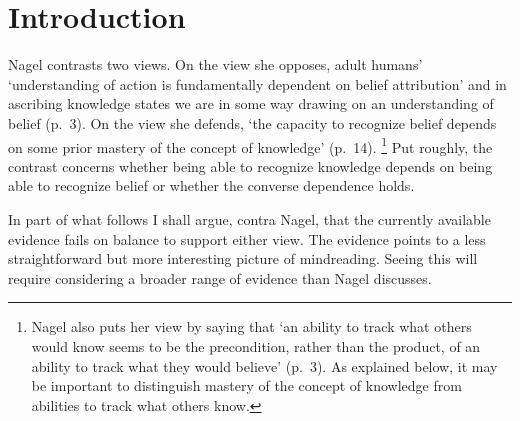 \documentclass[11pt,a4paper]{extarticle}
\begin{document}
\setlength\footnotesep{1em}




\maketitle





\section{Introduction}
Nagel contrasts two views.
On the view she opposes, adult humans' `understanding of action is fundamentally dependent on belief attribution' and in ascribing knowledge states we are in some way drawing on an understanding of belief (p.\ 3).
On the view she defends, `the capacity to recognize belief depends on some prior mastery of the concept of knowledge' (p.\ 14).%
\footnote{
Nagel also puts her view by saying that `an ability to track what others would know seems to be the precondition, rather than the product, of an ability to track what they would believe' (p.\ 3).
As explained below, it may be important to distinguish mastery of the concept of knowledge from abilities to track what others know.
}
Put roughly, the contrast concerns whether being able to recognize knowledge depends on being able to recognize belief or whether the converse dependence holds.

In part of what follows
I shall
argue, contra  Nagel, that
the currently available evidence fails on balance to support either view.
The evidence points to a less straightforward but more interesting picture of  mindreading.
Seeing this will require considering a broader range of evidence than Nagel discusses.
\end{document}
